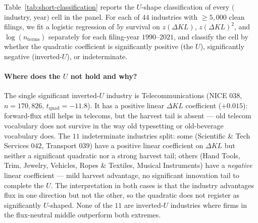 \documentclass[11pt]{article}
\begin{document}
Table~\ref{tab:short-classification} reports the $U$-shape
classification of every $($industry, year$)$ cell in the panel.
For each of $44$ industries with $\geq 5{,}000$ clean filings, we
fit a logistic regression of $5$y survival on $z(\Delta KL)$,
$z(\Delta KL)^2$, and $\log(n_{\text{terms}})$ separately for each
filing-year $1990$--$2021$, and classify the cell by whether the
quadratic coefficient is significantly positive (the $U$), significantly
negative (inverted-$U$), or indeterminate.

\begin{table}[h]
\centering
\small

\caption{$U$-shape classification of $44$ NICE classes individually
and of the $1{,}267$ $(\text{industry}, \text{year})$ cells where a
logit fit converged. The pooled $+U$ holds in $32$ of $44$ industries;
only $1$ has a significant inverted-$U$ (Telecommunications, where
the linear $\Delta KL$ effect is positive but the harvest tail is
absent). The remaining $11$ are not inverted-$U$ industries --- they
are indeterminate (no significant curvature in either direction).
Cell-level: $27\%$ of cells have a significant $+U$ on $\Delta KL$;
$6\%$ have a significant inverted-$U$; $67\%$ are indeterminate.
Linear-direction counting at the cell level shows a striking
asymmetry: $38\%$ of cells have a significant linear advantage to
\emph{negative} $\Delta KL$ (the harvest direction), versus $16\%$
with significant advantage to positive $\Delta KL$.}
\label{tab:short-classification}
\end{table}

\paragraph{Where does the $U$ not hold and why?} The single
significant inverted-$U$ industry is Telecommunications (NICE 038,
$n = 170{,}826$, $t_{\text{quad}} = -11.8$). It has a positive
linear $\Delta KL$ coefficient ($+0.015$): forward-flux still helps
in telecoms, but the harvest tail is absent --- old telecom
vocabulary does not survive in the way old typesetting or
old-beverage vocabulary does. The $11$ indeterminate industries
split: some (Scientific \& Tech Services $042$, Transport $039$)
have a positive linear coefficient on $\Delta KL$ but neither a
significant quadratic nor a strong harvest tail; others (Hand Tools,
Trim, Jewelry, Vehicles, Ropes \& Textiles, Musical Instruments)
have a \emph{negative} linear coefficient --- mild harvest advantage,
no significant innovation tail to complete the $U$. The interpretation
in both cases is that the industry advantages flux in one direction
but not the other, so the quadratic does not register as
significantly $U$-shaped. None of the $11$ are inverted-$U$
industries where firms in the flux-neutral middle outperform both
extremes.
\end{document}
